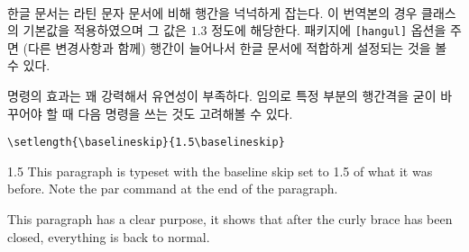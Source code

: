 \medskip

 \\
한글 문서는 라틴 문자 문서에 비해 행간을 넉넉하게 
잡는다. 이 번역본의 경우  클래스의 기본값을 적용하였으며 
그 값은 $1.3$ 정도에 해당한다.  패키지에 \texttt{[hangul]}
옵션을 주면 (다른 변경사항과 함께) 행간이 늘어나서 한글 문서에 적합하게 설정되는 것을 볼 수 있다.

\medskip

 명령의 효과는 꽤 강력해서 유연성이 부족하다.
임의로 특정 부분의 행간격을 굳이 바꾸어야 할 때 다음 명령을 쓰는 것도 고려해볼 수 있다.
\begin{lscommand}
\verb|\setlength{\baselineskip}{1.5\baselineskip}|
\end{lscommand}

\vspace{-.5\onelineskip}


\begin{example}
{\setlength{\baselineskip}%
           {1.5\baselineskip}
This paragraph is typeset with
the baseline skip set to 1.5 of
what it was before. Note the par
command at the end of the
paragraph.\par}
This paragraph has a clear
purpose, it shows that after the
curly brace has been closed,
everything is back to normal.
\end{example}

